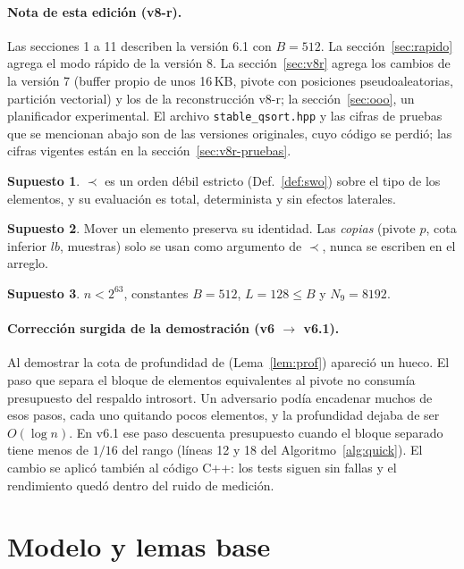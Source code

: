 \documentclass[10pt,a4paper]{article}
\theoremstyle{plain}
\theoremstyle{definition}
\newtheorem{supuesto}{Supuesto}
\theoremstyle{remark}
\newcommand{\lt}{\prec}
\newcommand{\Bsz}{B}
\newcommand{\leaf}{L}
\begin{document}
\paragraph{Nota de esta edición (v8-r).} Las secciones 1 a 11 describen la versión 6.1
con $\Bsz=512$. La sección~\ref{sec:rapido} agrega el modo rápido de la versión 8. La
sección~\ref{sec:v8r} agrega los cambios de la versión 7 (buffer propio de unos 16\,KB,
pivote con posiciones pseudoaleatorias, partición vectorial) y los de la reconstrucción
v8-r; la sección~\ref{sec:ooo}, un planificador experimental. El archivo
\texttt{stable\_qsort.hpp} y las cifras de pruebas que se mencionan abajo son de las
versiones originales, cuyo código se perdió; las cifras vigentes están en la
sección~\ref{sec:v8r-pruebas}.

\begin{supuesto}\label{sup:orden}
$\lt$ es un orden débil estricto (Def.~\ref{def:swo}) sobre el tipo de los elementos,
y su evaluación es total, determinista y sin efectos laterales.
\end{supuesto}
\begin{supuesto}\label{sup:ident}
Mover un elemento preserva su identidad. Las \emph{copias} (pivote $p$, cota inferior
$\mathit{lb}$, muestras) solo se usan como argumento de $\lt$, nunca se escriben en
el arreglo.
\end{supuesto}
\begin{supuesto}\label{sup:n}
$n < 2^{63}$, constantes $\Bsz = 512$, $\leaf = 128 \le \Bsz$ y $N_9 = 8192$.
\end{supuesto}

\paragraph{Corrección surgida de la demostración (v6 $\to$ v6.1).}
Al demostrar la cota de profundidad de \Quick (Lema~\ref{lem:prof}) apareció un hueco.
El paso que separa el bloque de elementos equivalentes al pivote no consumía
presupuesto del respaldo introsort. Un adversario podía encadenar muchos de esos
pasos, cada uno quitando pocos elementos, y la profundidad dejaba de ser $O(\log n)$.
En v6.1 ese paso descuenta presupuesto cuando el bloque separado tiene menos de
$1/16$ del rango (líneas 12 y 18 del Algoritmo~\ref{alg:quick}). El cambio se aplicó
también al código C++: los tests siguen sin fallas y el rendimiento quedó dentro del
ruido de medición.

\section{Modelo y lemas base}
\end{document}
